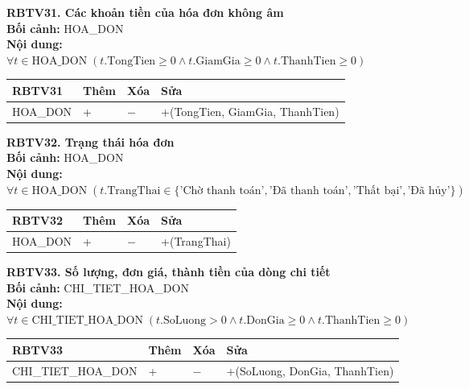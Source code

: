 \documentclass[11pt, a4paper]{article}
\begin{document}
\vspace{0.8em}
\textbf{RBTV31. Các khoản tiền của hóa đơn không âm} \\
\textbf{Bối cảnh:} HOA\_DON \\
\textbf{Nội dung:} $\forall t \in \text{HOA\_DON} \; (t.\text{TongTien} \ge 0 \land t.\text{GiamGia} \ge 0 \land t.\text{ThanhTien} \ge 0)$

\vspace{0.3em}
\begin{small}
\begin{tabularx}{\textwidth}{| C{4.2cm} | C{2cm} | C{2cm} | Y |}
\hline
\textbf{RBTV31} & \textbf{Thêm} & \textbf{Xóa} & \textbf{Sửa} \\
\hline
HOA\_DON & + & $-$ & +(TongTien, GiamGia, ThanhTien) \\
\hline
\end{tabularx}
\end{small}

\vspace{0.8em}
\textbf{RBTV32. Trạng thái hóa đơn} \\
\textbf{Bối cảnh:} HOA\_DON \\
\textbf{Nội dung:} $\forall t \in \text{HOA\_DON} \; (t.\text{TrangThai} \in \{\text{'Chờ thanh toán'}, \text{'Đã thanh toán'}, \text{'Thất bại'}, \text{'Đã hủy'}\})$

\vspace{0.3em}
\begin{small}
\begin{tabularx}{\textwidth}{| C{4.2cm} | C{2cm} | C{2cm} | Y |}
\hline
\textbf{RBTV32} & \textbf{Thêm} & \textbf{Xóa} & \textbf{Sửa} \\
\hline
HOA\_DON & + & $-$ & +(TrangThai) \\
\hline
\end{tabularx}
\end{small}

\vspace{0.8em}
\textbf{RBTV33. Số lượng, đơn giá, thành tiền của dòng chi tiết} \\
\textbf{Bối cảnh:} CHI\_TIET\_HOA\_DON \\
\textbf{Nội dung:} $\forall t \in \text{CHI\_TIET\_HOA\_DON} \; (t.\text{SoLuong} > 0 \land t.\text{DonGia} \ge 0 \land t.\text{ThanhTien} \ge 0)$

\vspace{0.3em}
\begin{small}
\begin{tabularx}{\textwidth}{| C{4.2cm} | C{2cm} | C{2cm} | Y |}
\hline
\textbf{RBTV33} & \textbf{Thêm} & \textbf{Xóa} & \textbf{Sửa} \\
\hline
CHI\_TIET\_HOA\_DON & + & $-$ & +(SoLuong, DonGia, ThanhTien) \\
\hline
\end{tabularx}
\end{small}
\end{document}
